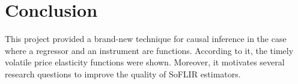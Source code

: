 \documentclass[11pt, a4paper, leqno]{article}
\begin{document}
\section{Conclusion}
This project provided a brand-new technique for causal inference in the case where a regressor and an instrument are functions. According to it, the timely volatile price elasticity functions were shown. Moreover, it motivates several research questions to improve the quality of SoFLIR estimators.











\newpage
{}
\printbibliography
{}



\end{document}
